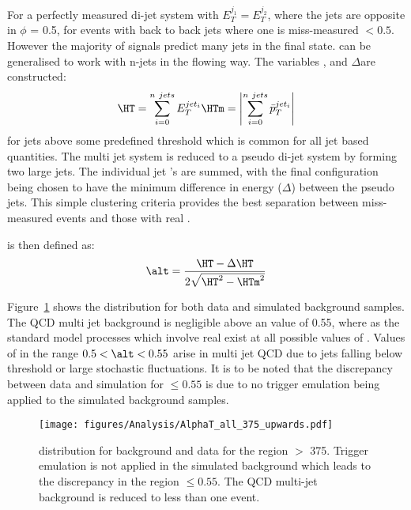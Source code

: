 For a perfectly measured di-jet system with $E_{T}^{j_{1}} = E_{T}^{j_{2}}$, 
where the jets are opposite in $\phi$ \alt = 0.5, for events with back to back 
jets where one is miss-measured \alt $ < 0.5$.
However the majority of signals predict many jets in the final state.
\alt can be generalised to work with n-jets in the flowing way.
The variables \HT, \HTm and $\Delta$\HT are constructed:
\begin{equation}
  \HT = \sum_{i = 0}^{n~jets}E_{T}^{jet_{i}} \\
  \HTm = \left|\sum_{i = 0}^{n~jets}\bar{p}_{T}^{jet_{i}}\right|
\end{equation}
for jets above some predefined threshold \ET which is common for all jet based 
quantities. The multi jet system is reduced to a pseudo di-jet system by 
forming two large jets. The individual jet \ET's are summed, with the final 
configuration being chosen to have the minimum difference in energy 
($\Delta$\HT) between the pseudo jets. This simple clustering criteria provides 
the best separation between miss-measured events and those with real \MET.

\alt is then defined as:
\begin{equation}
  \alt = \frac{\HT - \Delta\HT}{2\sqrt{\HT^{2}-\HTm^{2}}}
\end{equation}


Figure~\ref{fig:figures_Analysis_AlphaT_all_375_upwards} shows the \alt 
distribution for both data and simulated background samples. The QCD multi jet 
background is negligible above an \alt value of 0.55, where as the standard 
model processes which involve real \MET exist at all possible values of \alt.
Values of \alt in the range $0.5 < \alt < 0.55$ arise in multi jet QCD due to 
jets falling below threshold or large stochastic fluctuations.
It is to be noted that the discrepancy between data and simulation for \alt 
$\leq 0.55$ is due to no trigger emulation being applied to the simulated 
background samples.
\begin{figure}[ht|]
  \centering  \texttt{[image: figures/Analysis/AlphaT\_all\_375\_upwards.pdf]}
  \caption{\alt distribution for background and data for the region \HT $>$ 
  \unit{375}{\GeV}. Trigger emulation is not applied in the simulated 
  background which leads to the discrepancy in the region \alt $\leq 0.55$. The 
  QCD multi-jet background is reduced to less than one event.}
  \label{fig:figures_Analysis_AlphaT_all_375_upwards}
\end{figure}

